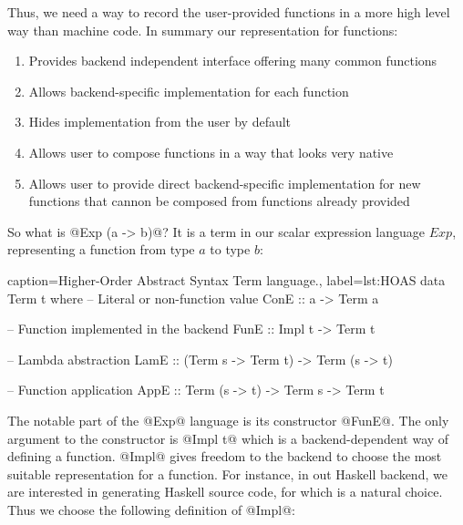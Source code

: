 \documentclass[preamble.tex]{subfiles}
\begin{document}
Thus, we need a way to record the user-provided functions in a more high level way than machine code. In summary our representation for functions:

\begin{enumerate}
\item Provides backend independent interface offering many common functions
\item Allows backend-specific implementation for each function
\item Hides implementation from the user by default
\item Allows user to compose functions in a way that looks very native
\item Allows user to provide direct backend-specific implementation for new functions that cannon be composed from functions already provided
\end{enumerate}


So what is @Exp (a -> b)@? It is a term in our scalar expression language $Exp$, representing a function from type $a$ to type $b$:

\begin{hscode2}{%
    caption={Higher-Order Abstract Syntax Term language.},%
    label=lst:HOAS}
data Term t where
  -- Literal or non-function value
  ConE :: a -> Term a

  -- Function implemented in the backend
  FunE :: Impl t -> Term t

  -- Lambda abstraction
  LamE :: (Term s -> Term t) -> Term (s -> t)

  -- Function application
  AppE :: Term (s -> t) -> Term s -> Term t
\end{hscode2}



The notable part of the @Exp@ language is its constructor @FunE@. The only argument to the constructor is @Impl t@ which is a backend-dependent way of defining a function. @Impl@ gives freedom to the backend to choose the most suitable representation for a function. For instance, in out Haskell backend, we are interested in generating Haskell source code, for which   is a natural choice. Thus we choose the following definition of @Impl@:
\end{document}
